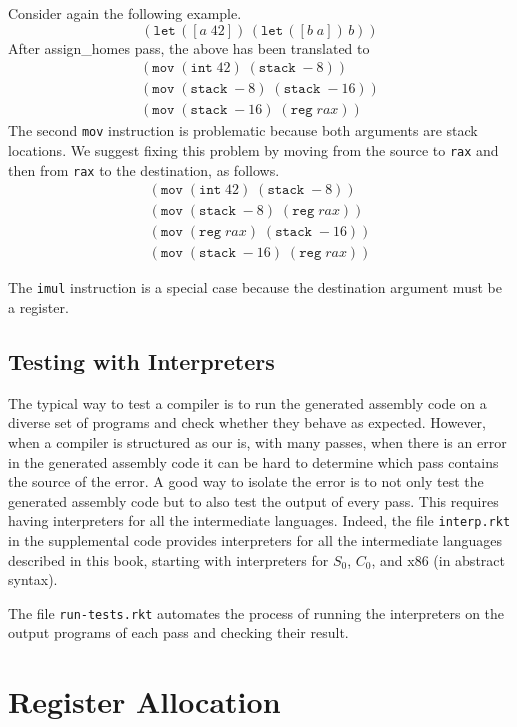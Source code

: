 \documentclass[12pt]{book}
\newcommand{\itm}[1]{\ensuremath{\mathit{#1}}}
\newcommand{\key}[1]{\texttt{#1}}
\newcommand{\LET}[3]{(\key{let}\,([#1\;#2])\,#3)}
\newcommand{\INT}[1]{(\key{int}\;#1)}
\newcommand{\REG}[1]{(\key{reg}\;#1)}
\newcommand{\STACKLOC}[1]{(\key{stack}\;#1)}
\begin{document}
Consider again the following example.
\[
\LET{a}{42}{ \LET{b}{a}{ b }}
\]
After \textsf{assign\_homes} pass, the above has been translated to
\[
\begin{array}{l}
(\key{mov} \;\INT{42}\; \STACKLOC{{-}8})\\
(\key{mov}\;\STACKLOC{{-}8}\; \STACKLOC{{-}16})\\
(\key{mov}\;\STACKLOC{{-}16}\; \REG{\itm{rax}})
\end{array}
\]
The second \key{mov} instruction is problematic because both arguments
are stack locations. We suggest fixing this problem by moving from the
source to \key{rax} and then from \key{rax} to the destination, as
follows.
\[
\begin{array}{l}
(\key{mov} \;\INT{42}\; \STACKLOC{{-}8})\\
(\key{mov}\;\STACKLOC{{-}8}\; \REG{\itm{rax}})\\
(\key{mov}\;\REG{\itm{rax}}\; \STACKLOC{{-}16})\\
(\key{mov}\;\STACKLOC{{-}16}\; \REG{\itm{rax}})
\end{array}
\]

The \key{imul} instruction is a special case because the destination
argument must be a register.

\section{Testing with Interpreters}

The typical way to test a compiler is to run the generated assembly
code on a diverse set of programs and check whether they behave as
expected. However, when a compiler is structured as our is, with many
passes, when there is an error in the generated assembly code it can
be hard to determine which pass contains the source of the error.  A
good way to isolate the error is to not only test the generated
assembly code but to also test the output of every pass. This requires
having interpreters for all the intermediate languages.  Indeed, the
file \key{interp.rkt} in the supplemental code provides interpreters
for all the intermediate languages described in this book, starting
with interpreters for $S_0$, $C_0$, and x86 (in abstract syntax).

The file \key{run-tests.rkt} automates the process of running the
interpreters on the output programs of each pass and checking their
result.

\chapter{Register Allocation}
\label{ch:register-allocation}
\end{document}
